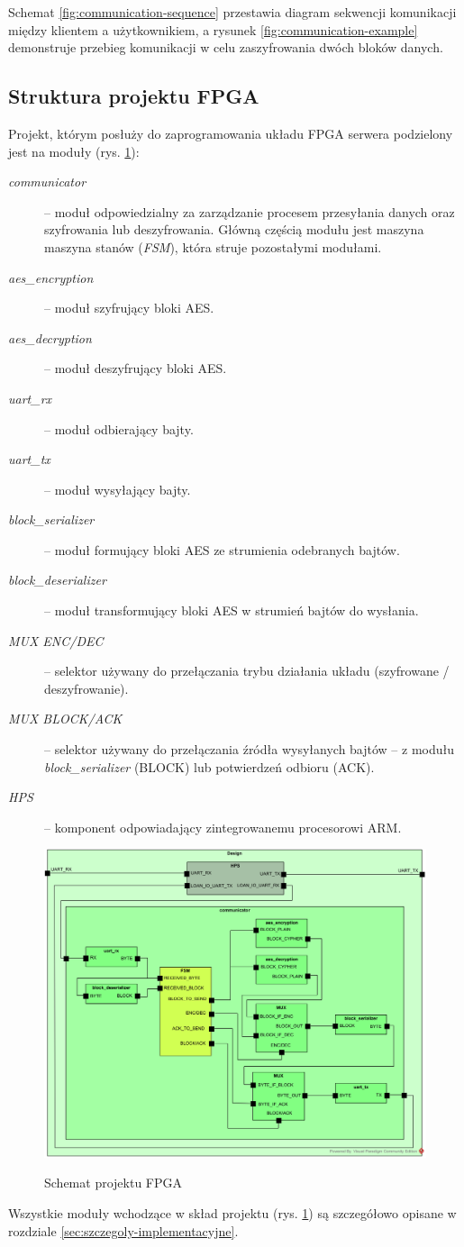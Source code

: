 Schemat \ref{fig:communication-sequence} przestawia diagram sekwencji komunikacji między klientem a użytkownikiem, a rysunek \ref{fig:communication-example} demonstruje przebieg komunikacji w celu zaszyfrowania dwóch bloków danych.

\newpage
\subsection{Struktura projektu FPGA}
Projekt, którym posłuży do zaprogramowania układu FPGA serwera podzielony jest na moduły (rys. \ref{fig:modules}):
\begin{description}
\item[\textit{communicator}] -- moduł odpowiedzialny za zarządzanie procesem przesyłania danych oraz szyfrowania lub deszyfrowania. Główną częścią modułu jest maszyna maszyna stanów (\textit{FSM}), która struje pozostałymi modułami.
\item[\textit{aes\_encryption}] -- moduł szyfrujący bloki AES.
\item[\textit{aes\_decryption}] -- moduł deszyfrujący bloki AES.
\item[\textit{uart\_rx}] -- moduł odbierający bajty.
\item[\textit{uart\_tx}] -- moduł wysyłający bajty.
\item[\textit{block\_serializer}] -- moduł formujący bloki AES ze strumienia odebranych bajtów.
\item[\textit{block\_deserializer}] -- moduł transformujący bloki AES w strumień bajtów do wysłania.
\item[\textit{MUX ENC/DEC}] -- selektor używany do przełączania trybu działania układu (szyfrowane / deszyfrowanie).
\item[\textit{MUX BLOCK/ACK}] -- selektor używany do przełączania źródła wysyłanych bajtów -- z modułu \textit{block\_serializer} (BLOCK) lub potwierdzeń odbioru (ACK).
\item[\textit{HPS}] -- komponent odpowiadający zintegrowanemu procesorowi ARM.
\end{description}

\begin{figure}[!h]
\centering
\includegraphics[width=\textwidth]{modules.png}
\label{fig:modules}
\caption{Schemat projektu FPGA}
\end{figure}

Wszystkie moduły wchodzące w skład projektu (rys. \ref{fig:modules}) są szczegółowo opisane w rozdziale \ref{sec:szczegoly-implementacyjne}.